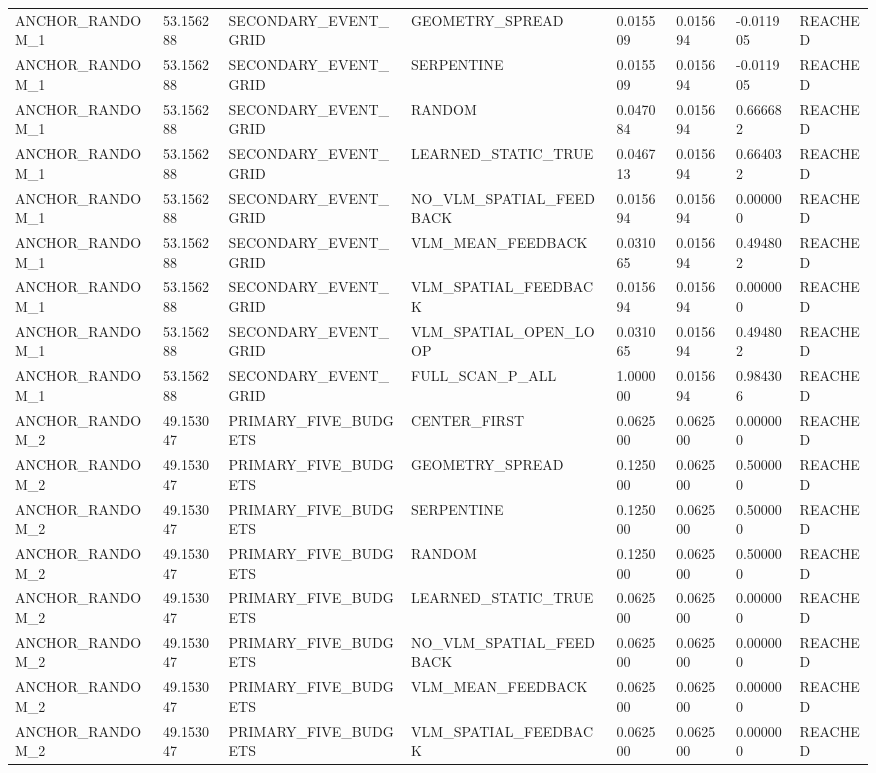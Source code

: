 \begin{tabular}{llllllll}
ANCHOR\_RANDOM\_1 & 53.156288 & SECONDARY\_EVENT\_GRID & GEOMETRY\_SPREAD & 0.015509 & 0.015694 & -0.011905 & REACHED \\
ANCHOR\_RANDOM\_1 & 53.156288 & SECONDARY\_EVENT\_GRID & SERPENTINE & 0.015509 & 0.015694 & -0.011905 & REACHED \\
ANCHOR\_RANDOM\_1 & 53.156288 & SECONDARY\_EVENT\_GRID & RANDOM & 0.047084 & 0.015694 & 0.666682 & REACHED \\
ANCHOR\_RANDOM\_1 & 53.156288 & SECONDARY\_EVENT\_GRID & LEARNED\_STATIC\_TRUE & 0.046713 & 0.015694 & 0.664032 & REACHED \\
ANCHOR\_RANDOM\_1 & 53.156288 & SECONDARY\_EVENT\_GRID & NO\_VLM\_SPATIAL\_FEEDBACK & 0.015694 & 0.015694 & 0.000000 & REACHED \\
ANCHOR\_RANDOM\_1 & 53.156288 & SECONDARY\_EVENT\_GRID & VLM\_MEAN\_FEEDBACK & 0.031065 & 0.015694 & 0.494802 & REACHED \\
ANCHOR\_RANDOM\_1 & 53.156288 & SECONDARY\_EVENT\_GRID & VLM\_SPATIAL\_FEEDBACK & 0.015694 & 0.015694 & 0.000000 & REACHED \\
ANCHOR\_RANDOM\_1 & 53.156288 & SECONDARY\_EVENT\_GRID & VLM\_SPATIAL\_OPEN\_LOOP & 0.031065 & 0.015694 & 0.494802 & REACHED \\
ANCHOR\_RANDOM\_1 & 53.156288 & SECONDARY\_EVENT\_GRID & FULL\_SCAN\_P\_ALL & 1.000000 & 0.015694 & 0.984306 & REACHED \\
ANCHOR\_RANDOM\_2 & 49.153047 & PRIMARY\_FIVE\_BUDGETS & CENTER\_FIRST & 0.062500 & 0.062500 & 0.000000 & REACHED \\
ANCHOR\_RANDOM\_2 & 49.153047 & PRIMARY\_FIVE\_BUDGETS & GEOMETRY\_SPREAD & 0.125000 & 0.062500 & 0.500000 & REACHED \\
ANCHOR\_RANDOM\_2 & 49.153047 & PRIMARY\_FIVE\_BUDGETS & SERPENTINE & 0.125000 & 0.062500 & 0.500000 & REACHED \\
ANCHOR\_RANDOM\_2 & 49.153047 & PRIMARY\_FIVE\_BUDGETS & RANDOM & 0.125000 & 0.062500 & 0.500000 & REACHED \\
ANCHOR\_RANDOM\_2 & 49.153047 & PRIMARY\_FIVE\_BUDGETS & LEARNED\_STATIC\_TRUE & 0.062500 & 0.062500 & 0.000000 & REACHED \\
ANCHOR\_RANDOM\_2 & 49.153047 & PRIMARY\_FIVE\_BUDGETS & NO\_VLM\_SPATIAL\_FEEDBACK & 0.062500 & 0.062500 & 0.000000 & REACHED \\
ANCHOR\_RANDOM\_2 & 49.153047 & PRIMARY\_FIVE\_BUDGETS & VLM\_MEAN\_FEEDBACK & 0.062500 & 0.062500 & 0.000000 & REACHED \\
ANCHOR\_RANDOM\_2 & 49.153047 & PRIMARY\_FIVE\_BUDGETS & VLM\_SPATIAL\_FEEDBACK & 0.062500 & 0.062500 & 0.000000 & REACHED \\

\end{tabular}
